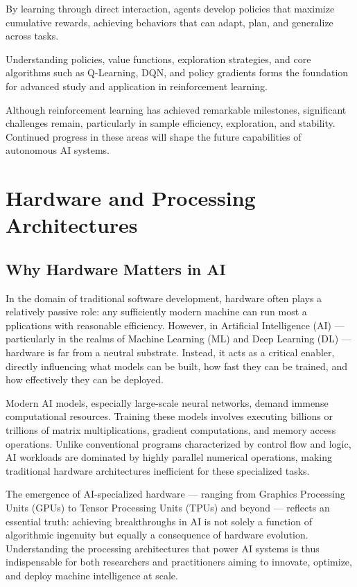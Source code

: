 \documentclass[openany]{book}
\begin{document}
By learning through direct interaction, agents develop policies that maximize 
cumulative rewards, achieving behaviors that can adapt, plan, and generalize 
across tasks.

Understanding policies, value functions, exploration strategies, and core 
algorithms such as Q-Learning, DQN, and policy gradients forms the foundation 
for advanced study and application in reinforcement learning.

Although reinforcement learning has achieved remarkable milestones, significant 
challenges remain, particularly in sample efficiency, exploration, and 
stability. Continued progress in these areas will shape the future capabilities 
of autonomous AI systems.


\chapter{Hardware and Processing Architectures}

\section{Why Hardware Matters in AI}

In the domain of traditional software development, hardware often plays a 
relatively passive role: any sufficiently modern machine can run most a
pplications with reasonable efficiency. However, in Artificial Intelligence (AI) 
— particularly in the realms of Machine Learning (ML) and Deep Learning (DL) — 
hardware is far from a neutral substrate. Instead, it acts as a critical 
enabler, directly influencing what models can be built, how fast they can be 
trained, and how effectively they can be deployed.

Modern AI models, especially large-scale neural networks, demand immense 
computational resources. Training these models involves executing billions or 
trillions of matrix multiplications, gradient computations, and memory access 
operations. Unlike conventional programs characterized by control flow and 
logic, AI workloads are dominated by highly parallel numerical operations, 
making traditional hardware architectures inefficient for these specialized 
tasks.

The emergence of AI-specialized hardware — ranging from Graphics Processing 
Units (GPUs) to Tensor Processing Units (TPUs) and beyond — reflects an 
essential truth: achieving breakthroughs in AI is not solely a function of 
algorithmic ingenuity but equally a consequence of hardware evolution. 
Understanding the processing architectures that power AI systems is thus 
indispensable for both researchers and practitioners aiming to innovate, 
optimize, and deploy machine intelligence at scale.
\end{document}
